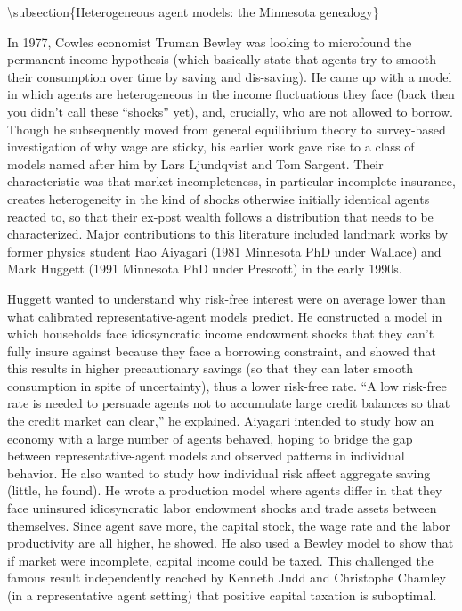 \documentclass[10pt,math=newtx,citestyle=gb7714-2015,bibstyle=gb7714-2015]{elegantbook}
\begin{document}
	\textbackslash{}subsection\{Heterogeneous agent models: the Minnesota genealogy\}
	
	In 1977, Cowles economist Truman Bewley was looking to microfound the permanent income hypothesis (which basically state that agents try to smooth their consumption over time by saving and dis-saving). He came up with a model in which agents are heterogeneous in the income fluctuations they face (back then you didn’t call these “shocks” yet), and, crucially, who are not allowed to borrow. Though he subsequently moved from general equilibrium theory to survey-based investigation of why wage are sticky, his earlier work gave rise to a class of models named after him by Lars Ljundqvist and Tom Sargent. Their characteristic was that market incompleteness, in particular incomplete insurance, creates heterogeneity in the kind of shocks otherwise initially identical agents reacted to, so that their ex-post wealth follows a distribution that needs to be characterized. Major contributions to this literature included landmark works by former physics student Rao Aiyagari (1981 Minnesota PhD under Wallace) and Mark Huggett (1991 Minnesota PhD under Prescott) in the early 1990s.
	
	Huggett wanted to understand why risk-free interest were on average lower than what calibrated representative-agent models predict. He constructed a model in which households face idiosyncratic income endowment shocks that they can’t fully insure against because they face a borrowing constraint, and showed that this results in higher precautionary savings (so that they can later smooth consumption in spite of uncertainty), thus a lower risk-free rate. “A low risk-free rate is needed to persuade agents not to accumulate large credit balances so that the credit market can clear,” he explained. Aiyagari intended to study how an economy with a large number of agents behaved, hoping to bridge the gap between representative-agent models and observed patterns in individual behavior. He also wanted to study how individual risk affect aggregate saving (little, he found). He wrote a production model where agents differ in that they face uninsured idiosyncratic labor endowment shocks and trade assets between themselves. Since agent save more, the capital stock, the wage rate and the labor productivity are all higher, he showed.  He also used a Bewley model to show that if market were incomplete, capital income could be taxed. This challenged the famous result independently reached by Kenneth Judd and Christophe Chamley (in a representative agent setting) that positive capital taxation is suboptimal.
	
\end{document}
